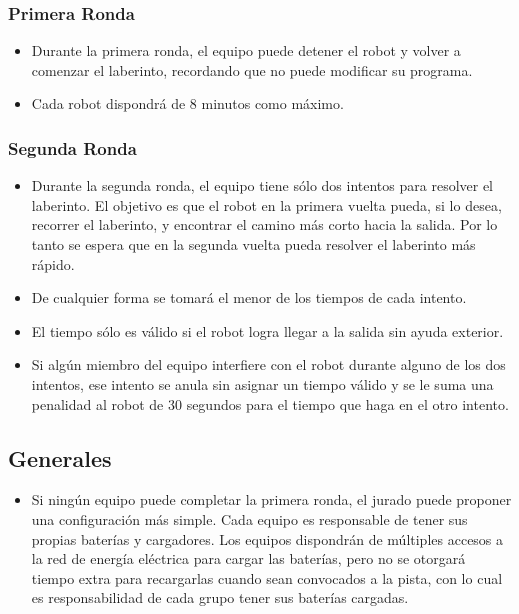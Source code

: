 \documentclass[a4paper,11pt]{article}
\begin{document}
\subsubsection*{Primera Ronda}
\begin{itemize}
  \item Durante la primera ronda, el equipo puede detener el robot y volver a comenzar el laberinto, recordando que no puede modificar su programa.
  \item Cada robot dispondrá de 8 minutos como máximo.
\end{itemize}    

\subsubsection*{Segunda Ronda}
\begin{itemize}
  \item Durante la segunda ronda, el equipo tiene sólo dos intentos para resolver el laberinto. El objetivo es que el robot en la primera vuelta pueda, si lo desea, recorrer el laberinto, y encontrar el camino más corto hacia la salida. Por lo tanto se espera que en la segunda vuelta pueda resolver el laberinto más rápido.
  \item De cualquier forma se tomará el menor de los tiempos de cada intento.
  \item El tiempo sólo es válido si el robot logra llegar a la salida sin ayuda exterior.
  \item Si algún miembro del equipo interfiere con el robot durante alguno de los dos intentos, ese intento se anula sin asignar un tiempo válido y se le suma una penalidad al robot de 30 segundos para el tiempo que haga en el otro intento.
\end{itemize}    

\subsection*{Generales}
\begin{itemize}
  \item Si ningún equipo puede completar la primera ronda, el jurado puede proponer una configuración más simple.
Cada equipo es responsable de tener sus propias baterías y cargadores. Los equipos dispondrán de múltiples accesos a la red de energía eléctrica para cargar las baterías, pero no se otorgará tiempo extra para recargarlas cuando sean convocados a la pista, con lo cual es responsabilidad de cada grupo tener sus baterías cargadas.
\end{itemize}    
\end{document}
